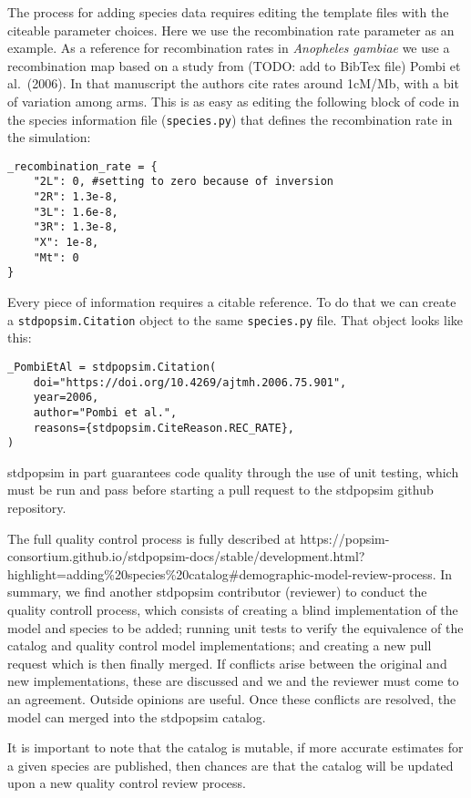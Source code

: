 \documentclass[hidelinks]{article}
\begin{document}
The process for adding species data requires editing the template files
with the citeable parameter choices. Here we use the recombination rate
parameter as an example. As a reference for recombination rates in
\emph{Anopheles gambiae} we use a recombination map based on a study
from (TODO: add to BibTex file) Pombi et al.~(2006). In that manuscript
the authors cite rates around 1cM/Mb, with a bit of variation among
arms. This is as easy as editing the following block of code in the
species information file (\texttt{species.py}) that defines the
recombination rate in the simulation:

\begin{verbatim}
_recombination_rate = {
    "2L": 0, #setting to zero because of inversion
    "2R": 1.3e-8,
    "3L": 1.6e-8,
    "3R": 1.3e-8,
    "X": 1e-8,
    "Mt": 0
}
\end{verbatim}

Every piece of information requires a citable reference. To do that we
can create a \texttt{stdpopsim.Citation} object to the same
\texttt{species.py} file. That object looks like this:

\begin{verbatim}
_PombiEtAl = stdpopsim.Citation(
    doi="https://doi.org/10.4269/ajtmh.2006.75.901",
    year=2006,
    author="Pombi et al.",
    reasons={stdpopsim.CiteReason.REC_RATE},
)
\end{verbatim}

stdpopsim in part guarantees code quality through the use of unit
testing, which must be run and pass before starting a pull request to
the stdpopsim github repository.

The full quality control process is fully described at
https://popsim-consortium.github.io/stdpopsim-docs/stable/development.html?highlight=adding\%20species\%20catalog\#demographic-model-review-process.
In summary, we find another stdpopsim contributor (reviewer) to conduct
the quality controll process, which consists of creating a blind
implementation of the model and species to be added; running unit tests
to verify the equivalence of the catalog and quality control model
implementations; and creating a new pull request which is then finally
merged. If conflicts arise between the original and new implementations,
these are discussed and we and the reviewer must come to an agreement.
Outside opinions are useful. Once these conflicts are resolved, the
model can merged into the stdpopsim catalog.

It is important to note that the catalog is mutable, if more accurate
estimates for a given species are published, then chances are that the
catalog will be updated upon a new quality control review process.
\end{document}
